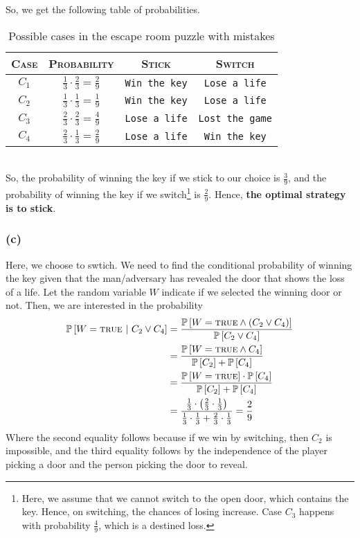 \documentclass[12pt]{article}
\newcommand{\prob}[1]{\mathbb{P}\left[#1\right]}
\newcommand{\true}{\textsc{true}}
\begin{document}
    So, we get the following table of probabilities.
    \begin{table}[htbp]
        \centering
        \renewcommand{\arraystretch}{1.5}
        \begin{tabular}{c|c|cc}
            \textsc{Case} & \textsc{Probability} & \textsc{Stick} & \textsc{Switch} \\
            \hline
            $C_{1}$ & $\frac{1}{3} \cdot \frac{2}{3} = \frac{2}{9}$ & \texttt{Win the key} & \texttt{Lose a life} \\
            $C_{2}$ & $\frac{1}{3} \cdot \frac{1}{3} = \frac{1}{9}$ & \texttt{Win the key} & \texttt{Lose a life} \\
            $C_{3}$ & $\frac{2}{3} \cdot \frac{2}{3} = \frac{4}{9}$ & \texttt{Lose a life} & \texttt{Lost the game} \\
            $C_{4}$ & $\frac{2}{3} \cdot \frac{1}{3} = \frac{2}{9}$ & \texttt{Lose a life} & \texttt{Win the key} \\
        \end{tabular}
        \caption{Possible cases in the escape room puzzle with mistakes}
        \label{tab:mistake-cases}
    \end{table}
    \vspace*{0pt} \\
    So, the probability of winning the key if we stick to our choice is $\frac{3}{9}$, and
    the probability of winning the key if we switch\footnote{
        Here, we assume that we cannot switch to the open door, which contains the key. Hence,
        on switching, the chances of losing increase. Case $C_{3}$ happens with probability
        $\frac{4}{9}$, which is a destined loss.
    } is $\frac{2}{9}$. Hence, \textbf{the optimal
    strategy is to stick}.

    \subsubsection*{(c)}
    Here, we choose to swtich. We need to find the conditional probability of winning the key given that
    the man/adversary has revealed the door that shows the loss of a life. Let the random variable
    $W$ indicate if we selected the winning door or not. Then, we are interested in the probability
    \begin{align}
        \prob{W = \true \ | \ C_{2} \vee C_{4}} &= \frac{\prob{W = \true \wedge (C_{2} \vee C_{4})}}{\prob{C_{2} \vee C_{4}}} \\
        &= \frac{\prob{W = \true \wedge C_{4}}}{\prob{C_{2}} + \prob{C_{4}}} \\
        &= \frac{\prob{W = \true} \cdot \prob{C_{4}}}{\prob{C_{2}} + \prob{C_{4}}} \\
        &= \frac{\frac{1}{3} \cdot \left( \frac{2}{3} \cdot \frac{1}{3} \right)}{\frac{1}{3} \cdot \frac{1}{3} + \frac{2}{3} \cdot \frac{1}{3}} = \frac{2}{9}
    \end{align}
    Where the second equality follows because if we win by switching, then $C_{2}$ is impossible, and the
    third equality follows by the independence of the player picking a door and the person picking the door to reveal.
\end{document}
